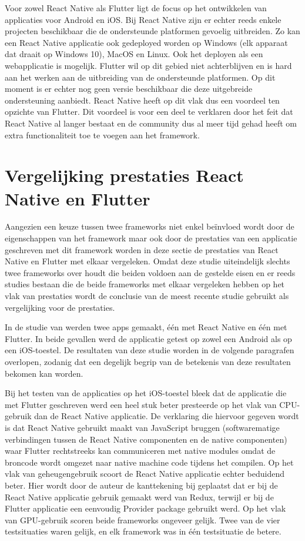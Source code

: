 Voor zowel React Native als Flutter ligt de focus op het ontwikkelen van applicaties voor Android en iOS. Bij React Native zijn er echter reeds enkele projecten beschikbaar die de ondersteunde platformen gevoelig uitbreiden. Zo kan een React Native applicatie ook gedeployed worden op Windows (elk apparaat dat draait op Windows 10), MacOS en Linux. Ook het deployen als een webapplicatie is mogelijk. Flutter wil op dit gebied niet achterblijven en is hard aan het werken aan de uitbreiding van de ondersteunde platformen. Op dit moment is er echter nog geen versie beschikbaar die deze uitgebreide ondersteuning aanbiedt. React Native heeft op dit vlak dus een voordeel ten opzichte van Flutter. Dit voordeel is voor een deel te verklaren door het feit dat React Native al langer bestaat en de community dus al meer tijd gehad heeft om extra functionaliteit toe te voegen aan het framework.

\section{Vergelijking prestaties React Native en Flutter}
\label{sec:vglPrestaties}

Aangezien een keuze tussen twee frameworks niet enkel beïnvloed wordt door de eigenschappen van het framework maar ook door de prestaties van een applicatie geschreven met dit framework worden in deze sectie de prestaties van React Native en Flutter met elkaar vergeleken. Omdat deze studie uiteindelijk slechts twee frameworks over houdt die beiden voldoen aan de gestelde eisen en er reeds studies bestaan die de beide frameworks met elkaar vergeleken hebben op het vlak van prestaties wordt de conclusie van de meest recente studie gebruikt als vergelijking voor de prestaties. 

In de studie van \textcite{Fentaw2020} werden twee apps gemaakt, één met React Native en één met Flutter. In beide gevallen werd de applicatie getest op zowel een Android als op een iOS-toestel. De resultaten van deze studie worden in de volgende paragrafen overlopen, zodanig dat een degelijk begrip van de betekenis van deze resultaten bekomen kan worden.

Bij het testen van de applicaties op het iOS-toestel bleek dat de applicatie die met Flutter geschreven werd een heel stuk beter presteerde op het vlak van CPU-gebruik dan de React Native applicatie. De verklaring die hiervoor gegeven wordt is dat React Native gebruikt maakt van JavaScript bruggen (softwarematige verbindingen tussen de React Native componenten en de native componenten) waar Flutter rechtstreeks kan communiceren met native modules omdat de broncode wordt omgezet naar native machine code tijdens het compilen. Op het vlak van geheugengebruik scoort de React Native applicatie echter beduidend beter. Hier wordt door de auteur de kanttekening bij geplaatst dat er bij de React Native applicatie gebruik gemaakt werd van Redux, terwijl er bij de Flutter applicatie een eenvoudig Provider package gebruikt werd. Op het vlak van GPU-gebruik scoren beide frameworks ongeveer gelijk. Twee van de vier testsituaties waren gelijk, en elk framework was in één testsituatie de betere. 


